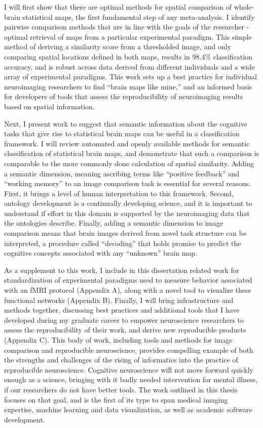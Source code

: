 \documentclass{report}
\begin{document}
I will first show that there are optimal methods for spatial comparison of whole-brain statistical maps, the first fundamental step of any meta-analysis. I identify pairwise comparison methods that are in line with the goals of the researcher - optimal retrieval of maps from a particular experimental paradigm. This simple method of deriving a similarity score from a thresholded image, and only comparing spatial locations defined in both maps, results in 98.4\% classification accuracy, and is robust across data derived from different individuals and a wide array of experimental paradigms. This work sets up a best practice for individual neuroimaging researchers to find ``brain maps like mine,'' and an informed basis for developers of tools that assess the reproducibility of neuroimaging results based on spatial information.

Next, I present work to suggest that semantic information about the cognitive tasks that give rise to statistical brain maps can be useful in a classification framework. I will review automated and openly available methods for semantic classification of statistical brain maps, and demonstrate that such a comparison is comparable to the more commonly done calculation of spatial similarity. Adding a semantic dimension, meaning ascribing terms like ``positive feedback'' and ``working memory'' to an image comparison task is essential for several reasons. First, it brings a level of human interpretation to this framework. Second, ontology development is a continually developing science, and it is important to understand if effort in this domain is supported by the neuroimaging data that the ontologies describe. Finally, adding a semantic dimension to image comparison means that brain images derived from novel task structure can be interpreted, a procedure called ``decoding'' that holds promise to predict the cognitive concepts associated with any ``unknown'' brain map.

As a supplement to this work, I include in this dissertation related work for standardization of experimental paradigms used to measure behavior associated with an fMRI protocol (Appendix A), along with a novel tool to visualize these functional networks (Appendix B). Finally, I will bring infrastructure and methods together, discussing best practices and additional tools that I have developed during my
graduate career to empower neuroscience researchers to assess the
reproducibility of their work, and derive new reproducible products (Appendix C). This body of work, including tools and methods for image comparison and reproducible neuroscience, provides compelling example of both the strengths and challenges of
the rising of informatics into the practice of reproducible neuroscience. Cognitive neuroscience will not move forward quickly enough as a science, bringing
with it badly needed intervention for mental illness, if our researchers
do not have better tools. The work outlined in this thesis focuses on
that goal, and is the first of its type to span medical imaging
expertise, machine learning and data visualization, as well as academic
software development.
\end{document}
